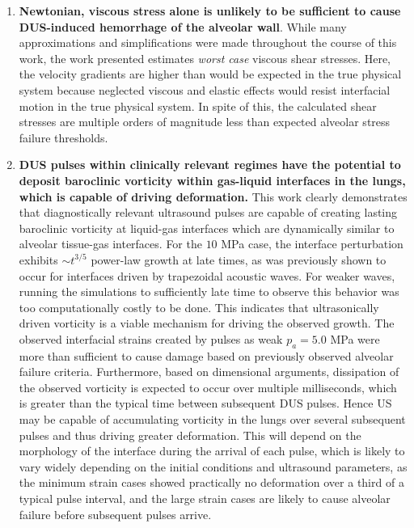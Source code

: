 \begin{enumerate}
\item \textbf{Newtonian, viscous stress alone is unlikely to be
    sufficient to cause \ac{DUS}-induced hemorrhage of the alveolar
    wall}. While many approximations and simplifications were made
  throughout the course of this work, the work presented estimates
  \textit{worst case} viscous shear stresses. Here, the velocity
  gradients are higher than would be expected in the true physical
  system because neglected viscous and elastic effects would resist
  interfacial motion in the true physical system. In spite of this,
  the calculated shear stresses are multiple orders of magnitude less
  than expected alveolar stress failure thresholds.
\item \textbf{\ac{DUS} pulses within clinically relevant regimes have
    the potential to deposit baroclinic vorticity within gas-liquid
    interfaces in the lungs, which is capable of driving deformation.}
  This work clearly demonstrates that diagnostically relevant
  ultrasound pulses are capable of creating lasting baroclinic
  vorticity at liquid-gas interfaces which are dynamically similar to
  alveolar tissue-gas interfaces. For the $10$ MPa case, the interface
  perturbation exhibits $\sim t^{3/5}$ power-law growth at late times,
  as was previously shown to occur for interfaces driven by
  trapezoidal acoustic waves. For weaker waves, running the
  simulations to sufficiently late time to observe this behavior was
  too computationally costly to be done. This indicates that
  ultrasonically driven vorticity is a viable mechanism for driving
  the observed growth. The observed interfacial strains created by
  pulses as weak $p_a = 5.0$ MPa were more than sufficient to cause
  damage based on previously observed alveolar failure
  criteria. Furthermore, based on dimensional arguments, dissipation
  of the observed vorticity is expected to occur over multiple
  milliseconds, which is greater than the typical time between
  subsequent \ac{DUS} pulses. Hence \ac{US} may be capable of
  accumulating vorticity in the lungs over several subsequent pulses
  and thus driving greater deformation. This will depend on the
  morphology of the interface during the arrival of each pulse, which
  is likely to vary widely depending on the initial conditions and
  ultrasound parameters, as the minimum strain cases showed
  practically no deformation over a third of a typical pulse interval,
  and the large strain cases are likely to cause alveolar failure
  before subsequent pulses arrive. 
\end{enumerate}



